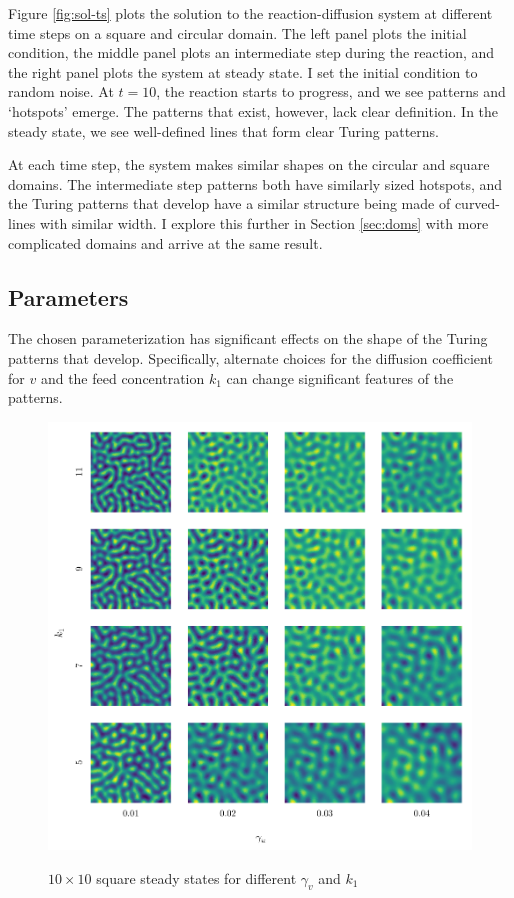 Figure \ref{fig:sol-ts} plots the solution to the reaction-diffusion system at different time steps on a square and circular domain. The left panel plots the initial condition, the middle panel plots an intermediate step during the reaction, and the right panel plots the system at steady state. I set the initial condition to random noise. At $t = 10$, the reaction starts to progress, and we see patterns and `hotspots' emerge. The patterns that exist, however, lack clear definition. In the steady state, we see well-defined lines that form clear Turing patterns.

At each time step, the system makes similar shapes on the circular and square domains. The intermediate step patterns both have similarly sized hotspots, and the Turing patterns that develop have a similar structure being made of curved-lines with similar width. I explore this further in Section \ref{sec:doms} with more complicated domains and arrive at the same result.


\subsection{Parameters}

The chosen parameterization has significant effects on the shape of the Turing patterns that develop. Specifically, alternate choices for the diffusion coefficient for $v$ and the feed concentration $k_1$ can change significant features of the patterns.

\begin{figure}[t!]
    \centering
    \caption{$10 \times 10$ square steady states for different $\gamma_v$ and $k_1$}
    \includegraphics{figures/square_params.pdf}
    \label{fig:sq-pars}
\end{figure}


